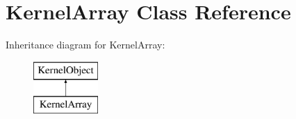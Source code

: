 \hypertarget{class_kernel_array}{}\section{Kernel\+Array Class Reference}
\label{class_kernel_array}
Inheritance diagram for Kernel\+Array\+:\begin{figure}[H]
\begin{center}
\leavevmode
\includegraphics[height=2.000000cm]{class_kernel_array}
\end{center}
\end{figure}
